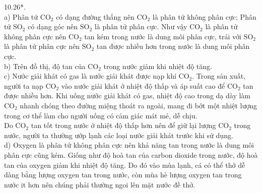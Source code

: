 \documentclass[10pt]{article}
\begin{document}
10.26*.\\
a) Phân tử $\mathrm{CO}_{2}$ có dạng đường thẳng nên $\mathrm{CO}_{2}$ là phân tử không phân cực; Phân tử $\mathrm{SO}_{2}$ có dạng góc nên $\mathrm{SO}_{2}$ là phân tử phân cực. Như vậy $\mathrm{CO}_{2}$ là phân tử không phân cực nên $\mathrm{CO}_{2}$ tan kém trong nước là dung môi phân cực, trái với $\mathrm{SO}_{2}$ là phân tử phân cực nên $\mathrm{SO}_{2}$ tan được nhiều hơn trong nước là dung môi phân cực.\\
b) Trên đồ thị, độ tan của $\mathrm{CO}_{2}$ trong nước giảm khi nhiệt độ tăng.\\
c) Nước giải khát có gas là nước giải khát được nạp khí $\mathrm{CO}_{2}$. Trong sản xuất, người ta nạp $\mathrm{CO}_{2}$ vào nước giải khát ở nhiệt độ thấp và áp suất cao để $\mathrm{CO}_{2}$ tan được nhiều hơn. Khi uống nước giải khát có gas, nhiệt độ cao trong dạ dày làm $\mathrm{CO}_{2}$ nhanh chóng theo đường miệng thoát ra ngoài, mang đi bớt một nhiệt lượng trong cơ thể làm cho người uống có cảm giác mát mẻ, dễ chịu.\\
Do $\mathrm{CO}_{2}$ tan tốt trong nước ở nhiệt độ thấp hơn nên để giữ lại lượng $\mathrm{CO}_{2}$ trong nước, người ta thường ướp lạnh các loại nước giải khát trước khi sử dụng.\\
d) Oxygen là phân tử không phân cực nên khả năng tan trong nước là dung môi phân cực cũng kém. Giống như độ hoà tan của carbon dioxide trong nước, độ hoà tan của oxygen giảm khi nhiệt độ tăng. Do đó vào mùa lạnh, cá có thể thở dễ dàng bằng lượng oxygen tan trong nước, còn mùa hè lượng oxygen tan trong nước it hơn nên chúng phải thường ngoi lên mặt nước đề thở.
\end{document}
